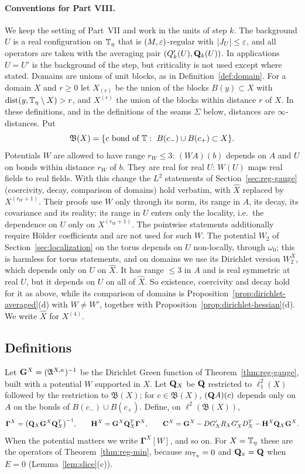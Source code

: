 \paragraph{Conventions for Part VIII.} We keep the setting of Part~VII and work in the units of step $k$. The background $U$ is a real configuration on $\mathbb T_\eta$ that is $(M,\varepsilon)$-regular with $|J_U|\le\varepsilon$, and all operators are taken with the averaging pair $(Q'_k(U),\mathbf Q_k(U))$. In applications $U=U'$ is the background of the step, but criticality is not used except where stated. Domains are unions of unit blocks, as in Definition~\ref{def:domain}. For a domain $X$ and $r\ge0$ let $X_{(r)}$ be the union of the blocks $B(y)\subset X$ with $\operatorname{dist}(y,\mathbb T_\eta\setminus X)>r$, and $X^{(r)}$ the union of the blocks within distance $r$ of $X$. In these definitions, and in the definitions of the seams $\Sigma$ below, distances are $\infty$-distances. Put
\[
\mathfrak B(X)=\{c\text{ bond of }\T:\ B(c_-)\cup B(c_+)\subset X\}.
\]
Potentials $W$ are allowed to have range $r_W\le3$: $(WA)(b)$ depends on $A$ and $U$ on bonds within distance $r_W$ of $b$. They are real for real $U$: $W(U)$ maps real fields to real fields. With this change the $L^2$ statements of Section~\ref{sec:reg-gauge} (coercivity, decay, comparison of domains) hold verbatim, with $\hat X$ replaced by $X^{(r_W+1)}$. Their proofs use $W$ only through its norm, its range in $A$, its decay, its covariance and its reality; its range in $U$ enters only the locality, i.e.\ the dependence on $U$ only on $X^{(r_W+1)}$. The pointwise statements additionally require H\"older coefficients and are not used for such $W$. The potential $W_2$ of Section~\ref{sec:localization} on the torus depends on $U$ non-locally, through $\omega_0$; this is harmless for torus statements, and on domains we use its Dirichlet version $W_2^X$, which depends only on $U$ on $\hat X$. It has range $\le3$ in $A$ and is real symmetric at real $U$, but it depends on $U$ on all of $\hat X$. So existence, coercivity and decay hold for it as above, while its comparison of domains is Proposition~\ref{prop:dirichlet-averaged}(d) with $W\ne W'$, together with Proposition~\ref{prop:dirichlet-hessian}(d). We write $\hat X$ for $X^{(4)}$.

\subsection{Definitions}

Let $\mathbf G^X=(\mathfrak A^{X,\kappa})^{-1}$ be the Dirichlet Green function of Theorem~\ref{thm:reg-gauge}, built with a potential $W$ supported in $X$. Let $\mathbf Q_X$ be $\mathbf Q$ restricted to $\ell^2_1(X)$ followed by the restriction to $\mathfrak B(X)$; for $c\in\mathfrak B(X)$, $(\mathbf Q A)(c)$ depends only on $A$ on the bonds of $B(c_-)\cup B(c_+)$. Define, on $\ell^2(\mathfrak B(X))$,
\[
\boldsymbol\Gamma^X=\big(\mathbf Q_X\mathbf G^X\mathbf Q_X^T\big)^{-1},\qquad\mathbf H^X=\mathbf G^X\mathbf Q_X^T\boldsymbol\Gamma^X,\qquad\mathbf C^X=\mathbf G^X-DG'_XR_XG'_XD^T_X-\mathbf H^X\mathbf Q_X\mathbf G^X .
\]
When the potential matters we write $\boldsymbol\Gamma^X[W]$, and so on. For $X=\mathbb T_\eta$ these are the operators of Theorem~\ref{thm:reg-min}, because $m_{\mathbb T_\eta}=0$ and $\mathbf Q_\pi=\mathbf Q$ when $E=0$ (Lemma~\ref{lem:slice}(c)).

